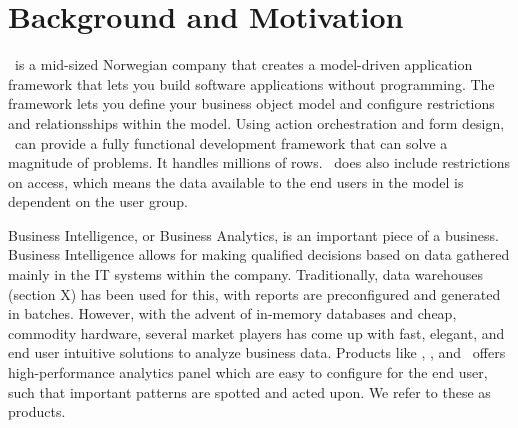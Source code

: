 \section{Background and Motivation}
\label{sec:background-and-motivation}

\genus~is a mid-sized Norwegian company that creates a model-driven application framework that lets you build software applications without programming. The framework lets you define your business object model and configure restrictions and relationsships within the model. Using action orchestration and form design, \genusSoftware~can provide a fully functional development framework that can solve a magnitude of problems. It handles millions of rows. \genusSoftware~does also include restrictions on access, which means the data available to the end users in the model is dependent on the user group. 

Business Intelligence, or Business Analytics, is an important piece of a business. Business Intelligence allows for making qualified decisions based on data gathered mainly in the IT systems within the company. Traditionally, data warehouses (section X) has been used for this, with reports are preconfigured and generated in batches. However, with the advent of in-memory databases and cheap, commodity hardware, several market players has come up with fast, elegant, and end user intuitive solutions to analyze business data. Products like \qlikview, \tableau, and \powerpivot~offers high-performance analytics panel which are easy to configure for the end user, such that important patterns are spotted and acted upon. We refer to these as  products.

